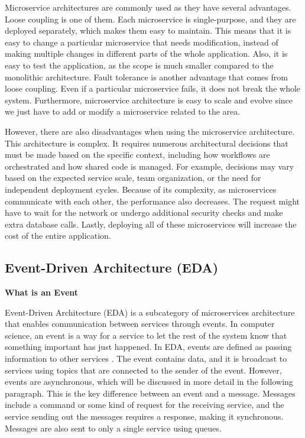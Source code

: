 Microservice architectures are commonly used as they have several advantages.
Loose coupling is one of them. Each microservice is single-purpose, and they are deployed separately,
which makes them easy to maintain. This means that it is easy to change a particular microservice that needs modification,
instead of making multiple changes in different parts of the whole application.
Also, it is easy to test the application, as the scope is much smaller compared to the monolithic architecture.
Fault tolerance is another advantage that comes from loose coupling. Even if a particular microservice fails,
it does not break the whole system. Furthermore, microservice architecture is easy to scale and evolve since we just have to add or
modify a microservice related to the area.

However, there are also disadvantages when using the microservice architecture. 
This architecture is complex. It requires numerous architectural decisions that must be made based on the specific context,
including how workflows are orchestrated and how shared code is managed.
For example, decisions may vary based on the expected service scale, team organization, or the need for independent deployment cycles.
Because of its complexity, as microservices communicate with each other, the performance also decreases.
The request might have to wait for the network or undergo additional security checks and make extra database calls.
Lastly, deploying all of these microservices will increase the cost of the entire application.  

\subsection[Event-Driven Architecture (EDA)]{Event-Driven Architecture (EDA)}
\noindent \textbf{What is an Event}

Event-Driven Architecture (EDA) is a subcategory of microservices architecture that enables communication between services through events.
In computer science, an event is a way for a service to let the rest of the system know that something important has just happened.
In EDA, events are defined as passing information to other services \cite{Gandhi_Richards_Ford_2024}.
The event contains data, and it is broadcast to services using topics that are connected to the sender of the event.
However, events are asynchronous, which will be discussed in more detail in the following paragraph.
This is the key difference between an event and a message. Messages include a command or some kind of request for the receiving service,
and the service sending out the messages requires a response, making it synchronous.
Messages are also sent to only a single service using queues. \\

